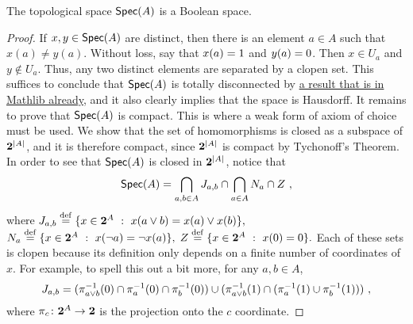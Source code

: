 \documentclass[a4paper,10pt]{article}
\numberwithin{theorem}{section}
\begin{document}
\begin{theorem}
    The topological space $\operatorname*{\mathsf{Spec}}(A)$ is a Boolean space.
\end{theorem}
\begin{proof}
    If $x, y \in \operatorname*{\mathsf{Spec}}(A)$ are distinct, then there is an element $a \in A$
    such that $x(a) \neq y(a)$. Without loss, say that $x(a) = 1$ and $y(a)
    = 0$. Then $x \in U_a$ and $y \not\in U_a$. Thus, any two distinct
    elements are separated by a clopen set. This suffices to conclude that
    $\operatorname*{\mathsf{Spec}}(A)$ is totally disconnected by
    \href{https://leanprover-community.github.io/mathlib4_docs/Mathlib/Topology/Connected/TotallyDisconnected.html#isTotallyDisconnected_of_isClopen_set}{
    a result that is in Mathlib already}, and it also clearly implies that the
    space is Hausdorff. It remains to prove that $\operatorname*{\mathsf{Spec}}(A)$ is compact. This is
    where a weak form of axiom of choice must be used. 
    We show that the set of homomorphisms
    is closed as a subspace of $\mathbf{2}^{|A|}$, and it is therefore compact,
    since $\mathbf{2}^{|A|}$ is compact by Tychonoff's Theorem. In order to see
    that $\operatorname*{\mathsf{Spec}}(A)$ is closed in $\mathbf{2}^{|A|}$, notice that
    \[ \operatorname*{\mathsf{Spec}}(A) = \bigcap_{a,b\in A} J_{a,b} \cap \bigcap_{a \in A} N_a \cap Z
    \ , \]
    where $J_{a,b} \stackrel{\mathrm{def}}{=} \{ x \in \mathbf{2}^A \ : \ x(a \vee b) = x(a) \vee x(b) \},$
    $N_a \stackrel{\mathrm{def}}{=}  \{x \in \mathbf{2}^A \ : \ x(\neg a) = \neg x(a) \},$ $Z \stackrel{\mathrm{def}}{=} \{ x
    \in \mathbf{2}^A \ : \ x(0) = 0\}.$ Each of these sets is clopen because its
    definition only depends on a finite number of coordinates of $x$. For example, to
    spell this out a bit more,
    for any $a, b \in A$,
    \[ J_{a,b} = 
        (\pi_{a \vee b}^{-1}(0) \cap \pi_{a}^{-1}(0) \cap
        \pi_{b}^{-1}(0)) \cup (\pi_{a \vee b}^{-1}(1) \cap
    (\pi_a^{-1}(1) \cup \pi_b^{-1}(1))) \ , \]
    where $\pi_c \colon \mathbf{2}^A \to \mathbf{2}$ is the projection onto the $c$
    coordinate.\qedhere

\end{proof}
\end{document}
